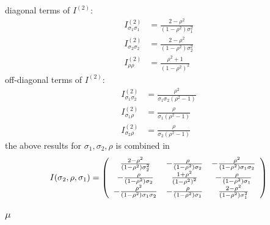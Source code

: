 \documentclass[11pt]{article}%
\theoremstyle{definition}
\begin{document}
diagonal terms of $I^{\left(  2\right)  }$:%
\begin{align}
I_{\sigma_{1}\sigma_{1}}^{\left(  2\right)  }  &  =\frac{2-\rho^{2}}{\left(
1-\rho^{2}\right)  \sigma_{1}^{2}}\label{fisher_info_beta}\\
I_{\sigma_{2}\sigma_{2}}^{\left(  2\right)  }  &  =\frac{2-\rho^{2}}{\left(
1-\rho^{2}\right)  \sigma_{2}^{2}}\nonumber\\
I_{\rho\rho}^{\left(  2\right)  }  &  =\frac{\rho^{2}+1}{\left(  1-\rho
^{2}\right)  ^{2}}\nonumber
\end{align}
off-diagonal terms of $I^{\left(  2\right)  }$:%
\begin{align*}
I_{\sigma_{1}\sigma_{2}}^{\left(  2\right)  }  &  =\frac{\rho^{2}}{\sigma
_{1}\sigma_{2}\left(  \rho^{2}-1\right)  }\\
I_{\sigma_{1}\rho}^{\left(  2\right)  }  &  =\frac{\rho}{\sigma_{1}\left(
\rho^{2}-1\right)  }\\
I_{\sigma_{2}\rho}^{\left(  2\right)  }  &  =\frac{\rho}{\sigma_{2}\left(
\rho^{2}-1\right)  }%
\end{align*}
the above results for $\sigma_{1},\sigma_{2},\rho$ is combined in%
\[
I(\sigma_{2},\rho,\sigma_{1})=\left(
\begin{array}
[c]{ccc}%
\frac{2-\rho^{2}}{\left(  1-\rho^{2}\right)  \sigma_{2}^{2}} & -\frac{\rho
}{\left(  1-\rho^{2}\right)  \sigma_{2}} & -\frac{\rho^{2}}{\left(  1-\rho
^{2}\right)  \sigma_{1}\sigma_{2}}\\
-\frac{\rho}{\left(  1-\rho^{2}\right)  \sigma_{2}} & \frac{1+\rho^{2}%
}{\left(  1-\rho^{2}\right)  ^{2}} & -\frac{\rho}{\left(  1-\rho^{2}\right)
\sigma_{1}}\\
-\frac{\rho^{2}}{\left(  1-\rho^{2}\right)  \sigma_{1}\sigma_{2}} &
-\frac{\rho}{\left(  1-\rho^{2}\right)  \sigma_{1}} & \frac{2-\rho^{2}%
}{\left(  1-\rho^{2}\right)  \sigma_{1}^{2}}%
\end{array}
\right)
\]


\subsubsection{$\mu$}
\end{document}
